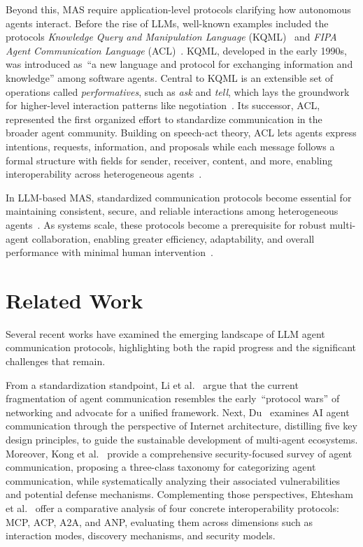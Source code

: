 \documentclass[pdflatex,sn-mathphys-num]{sn-jnl}%
\theoremstyle{thmstyleone}%
\theoremstyle{thmstyletwo}%
\theoremstyle{thmstylethree}%
\begin{document}
Beyond this, MAS require application-level protocols clarifying how autonomous agents interact. Before the rise of LLMs, well-known examples included the protocols \textit{Knowledge Query and Manipulation Language} (KQML)~\cite{finin1994kqml} and \textit{FIPA Agent Communication Language} (ACL)~\cite{labrou1999agent}. KQML, developed in the early 1990s, was introduced as~\enquote{a new language and protocol for exchanging information and knowledge} among software agents. Central to KQML is an extensible set of operations called \textit{performatives}, such as \textit{ask} and \textit{tell}, which lays the groundwork for higher-level interaction patterns like negotiation~\cite{finin1994kqml,labrou1999agent}. Its successor, ACL, represented the first organized effort to standardize communication in the broader agent community. Building on speech-act theory, ACL lets agents express intentions, requests, information, and proposals while each message follows a formal structure with fields for sender, receiver, content, and more, enabling interoperability across heterogeneous agents~\cite{labrou1999agent}.

In LLM-based MAS, standardized communication protocols become essential for maintaining consistent, secure, and reliable interactions among heterogeneous agents~\cite{yan2025beyond,ehtesham2025survey,kong2025survey}. As systems scale, these protocols become a prerequisite for robust multi-agent collaboration, enabling greater efficiency, adaptability, and overall performance with minimal human intervention~\cite{li2025llm,cemri2025multi}.

\section{Related Work} \label{sec:related-work}

Several recent works have examined the emerging landscape of LLM agent communication protocols, highlighting both the rapid progress and the significant challenges that remain. 

From a standardization standpoint, Li et al.~\cite{li2025llm} argue that the current fragmentation of agent communication resembles the early~\enquote{protocol wars} of networking and advocate for a unified framework. Next, Du~\cite{du2025ai} examines AI agent communication through the perspective of Internet architecture, distilling five key design principles, to guide the sustainable development of multi-agent ecosystems. Moreover, Kong et al.~\cite{kong2025survey} provide a comprehensive security-focused survey of agent communication, proposing a three-class taxonomy for categorizing agent communication, while systematically analyzing their associated vulnerabilities and potential defense mechanisms. Complementing those perspectives, Ehtesham et al.~\cite{ehtesham2025survey} offer a comparative analysis of four concrete interoperability protocols: MCP, ACP, A2A, and ANP, evaluating them across dimensions such as interaction modes, discovery mechanisms, and security models. 
\end{document}
